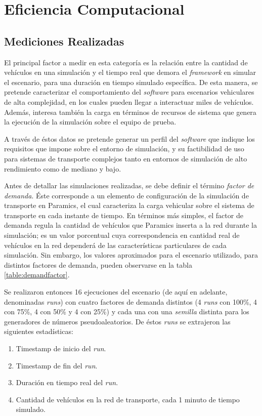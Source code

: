 \section{Eficiencia Computacional}\label{sec:results:performance}
\subsection{Mediciones Realizadas}

El principal factor a medir en esta categoría es la relación entre la cantidad de vehículos en una simulación y el tiempo real que demora el \emph{framework} en simular el escenario, para una duración en tiempo simulado específica. De esta manera, se pretende caracterizar el comportamiento del \emph{software} para escenarios vehiculares de alta complejidad, en los cuales pueden llegar a interactuar miles de vehículos. Además, interesa también la carga en términos de recursos de sistema que genera la ejecución de la simulación sobre el equipo de prueba. 

A través de éstos datos se pretende generar un perfil del \emph{software} que indique los requisitos que impone sobre el entorno de simulación, y su factibilidad de uso para sistemas de transporte complejos tanto en entornos de simulación de alto rendimiento como de mediano y bajo.

Antes de detallar las simulaciones realizadas, se debe definir el término \emph{factor de demanda}. Éste corresponde a un elemento de configuración de la simulación de transporte en Paramics, el cual caracteriza la carga vehicular sobre el sistema de transporte en cada instante de tiempo. En términos más simples, el factor de demanda regula la cantidad de vehículos que Paramics inserta a la red durante la simulación; es un valor porcentual cuya correspondencia en cantidad real de vehículos en la red dependerá de las características particulares de cada simulación. Sin embargo, los valores aproximados para el escenario utilizado, para distintos factores de demanda, pueden observarse en la tabla \ref{table:demandfactor}.

Se realizaron entonces 16 ejecuciones del escenario (de aquí en adelante, denominadas \emph{runs}) con cuatro factores de demanda distintos (4 \emph{runs} con 100\%, 4 con 75\%, 4 con 50\% y 4 con 25\%) y cada una con una \emph{semilla} distinta para los generadores de números pseudoaleatorios. De éstos \emph{runs} se extrajeron las siguientes estadísticas:

\begin{enumerate}
    \item Timestamp de inicio del \emph{run}.
    \item Timestamp de fin del \emph{run}.
    \item Duración en tiempo real del \emph{run}.
    \item Cantidad de vehículos en la red de transporte, cada 1 minuto de tiempo simulado.
\end{enumerate}


